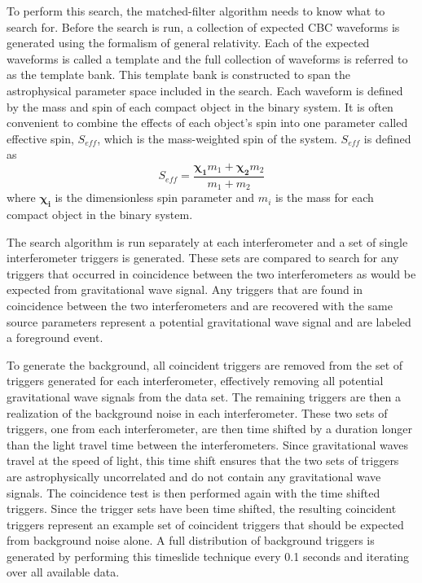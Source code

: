 To perform this search, the matched-filter algorithm needs to know what to search for.
Before the search is run, a collection of expected CBC waveforms is generated using
the formalism of general relativity. Each of the expected waveforms is called a template and
the full collection of waveforms is referred to as the template bank. This template bank
is constructed to span the astrophysical parameter space included in the search. 
Each waveform is defined by the mass and spin of each compact
object in the binary system. It is often convenient to combine the effects of each
object's spin into one parameter called effective spin, $S_{eff}$,
which is the
mass-weighted spin of the system. $S_{eff}$ is defined as
\begin{equation}
S_{eff} = \frac{\boldsymbol{\chi_{1}}m_{1} + \boldsymbol{\chi_{2}}m_{2}}{m_{1} + m_{2}}
\end{equation}
where $\boldsymbol{\chi_{i}}$ is the dimensionless spin parameter and $m_{i}$ is the
mass for each compact object in the binary system.

The search algorithm is run separately at each interferometer and a set of single interferometer
triggers is generated. These sets are compared to search for any triggers that occurred in
coincidence between the two interferometers as would be expected from gravitational wave
signal. Any triggers that are found in coincidence between the two interferometers and
are recovered with the same source parameters represent a potential gravitational wave signal
and are labeled a foreground event.

To generate the background, all coincident triggers are removed
from the set of triggers generated for each interferometer, effectively removing all
potential gravitational wave signals from the data set. The remaining triggers are then
a realization of the background noise in each interferometer. These two sets of triggers,
one from each interferometer, are then time shifted by a duration longer than the
light travel time between the interferometers.
Since gravitational waves travel at the speed of light, this time shift ensures that the
two sets of triggers are astrophysically uncorrelated and do not contain any gravitational
wave signals. The coincidence test is then performed again with the time shifted triggers.
Since the trigger sets have been time shifted, the resulting coincident triggers
represent an example set of coincident triggers that should be expected from background noise alone.
A full distribution of background triggers is generated by performing this timeslide
technique every 0.1 seconds and iterating over all available data.

